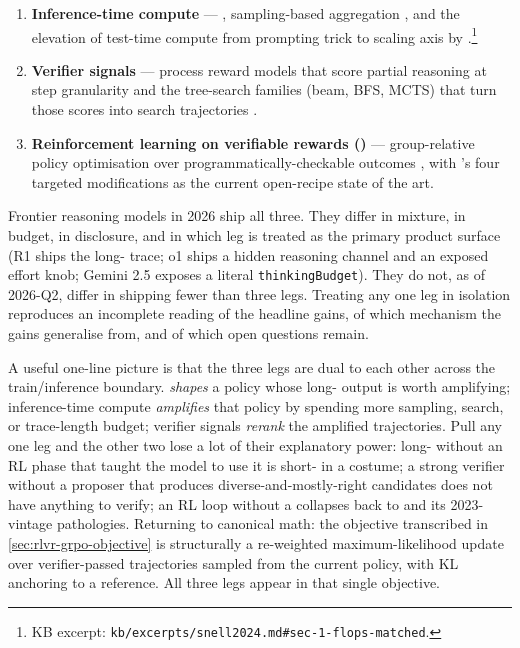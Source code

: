 \begin{enumerate}
\item \textbf{Inference-time compute} — 
  \citep{wei2022-cot,kojima2022}, sampling-based aggregation
  \citep{wang2022-self-consistency}, and the elevation of test-time
  compute from prompting trick to scaling axis by
  \citet{snell2024}.\footnote{KB excerpt:
  \texttt{kb/excerpts/snell2024.md\#sec-1-flops-matched}.}

\item \textbf{Verifier signals} — process reward models that score
  partial reasoning at step granularity \citep{lightman2023-prm800k}
  and the tree-search families (beam, BFS, MCTS) that turn those
  scores into search trajectories \citep{rstar-math2025}.

\item \textbf{Reinforcement learning on verifiable rewards ()} ---
  group-relative policy optimisation over programmatically-checkable
  outcomes \citep{shao2024}, with 's four targeted modifications
  \citep{dapo2025} as the current open-recipe state of the art.
\end{enumerate}

Frontier reasoning models in 2026 ship all three. They differ in
mixture, in budget, in disclosure, and in which leg is treated as the
primary product surface (R1 ships the long- trace; o1 ships a
hidden reasoning channel and an exposed effort knob; Gemini 2.5
exposes a literal \texttt{thinkingBudget}). They do not, as of
2026-Q2, differ in shipping fewer than three legs. Treating any one
leg in isolation reproduces an incomplete reading of the headline
gains, of which mechanism the gains generalise from, and of which open
questions remain.

\begin{intuition}
A useful one-line picture is that the three legs are dual to each
other across the train/inference boundary.  \emph{shapes} a policy
whose long- output is worth amplifying; inference-time compute
\emph{amplifies} that policy by spending more sampling, search, or
trace-length budget; verifier signals \emph{rerank} the amplified
trajectories. Pull any one leg and the other two lose a lot of their
explanatory power: long- without an RL phase that taught the model
to use it is short- in a costume; a strong verifier without a
proposer that produces diverse-and-mostly-right candidates does not
have anything to verify; an RL loop without a 
collapses back to  and its 2023-vintage pathologies. Returning to
canonical math: the  objective transcribed in
\cref{sec:rlvr-grpo-objective} is structurally a re-weighted
maximum-likelihood update over verifier-passed trajectories sampled
from the current policy, with KL anchoring to a reference. All three
legs appear in that single objective.
\end{intuition}

